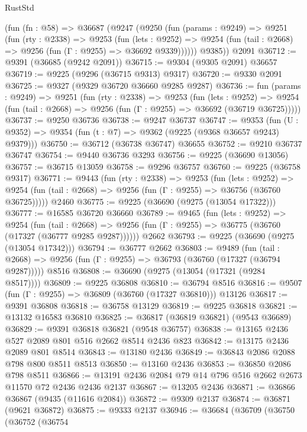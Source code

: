 \begin{lexlean}{RustStd}
\begin{coremodule}
    (fun (fn : @58) =>
    @36687
      (@9247
        (@9250
          (fun (params : @9249) =>
          @9251
            (fun (rty : @2338) =>
            @9253
              (fun (lets : @9252) =>
              @9254 (fun (tail : @2668) => @9256 (fun (Γ : @9255) => @36692 @9339))))))
        @9385))
    @2091
@36712 := @9391 (@36685 (@9242 @2091))
@36715 := @9304 (@9305 @2091) @36657
@36719 := @9225 (@9296 (@36715 @9313) @9317)
@36720 := @9330 @2091
@36725 := @9327 (@9329 @36720 @36660 @9285 @9287)
@36736 := fun (params : @9249) =>
  @9251
    (fun (rty : @2338) =>
    @9253
      (fun (lets : @9252) =>
      @9254 (fun (tail : @2668) => @9256 (fun (Γ : @9255) => @36692 (@36719 @36725)))))
@36737 := @9250 @36736
@36738 := @9247 @36737
@36747 := @9353
    (fun (U : @9352) => @9354 (fun (t : @7) => @9362 (@9225 (@9368 @36657 @9243) @9379)))
@36750 := @36712 (@36738 @36747) @36655
@36752 := @9210 @36737 @36747
@36754 := @9440 @36736 @3293
@36756 := @9225 (@36690 @13056)
@36757 := @36715 @13059
@36758 := @9296 @36757
@36760 := @9225 (@36758 @9317)
@36771 := @9443
    (fun (rty : @2338) =>
    @9253
      (fun (lets : @9252) =>
      @9254 (fun (tail : @2668) => @9256 (fun (Γ : @9255) => @36756 (@36760 @36725)))))
    @2460
@36775 := @9225 (@36690 (@9275 (@13054 @17322)))
@36777 := @16585 @36720 @36660
@36789 := @9465
    (fun (lets : @9252) =>
    @9254
      (fun (tail : @2668) =>
      @9256 (fun (Γ : @9255) => @36775 (@36760 (@17327 (@36777 @9285 @9287))))))
    @2662
@36793 := @9225 (@36690 (@9275 (@13054 @17342)))
@36794 := @36777 @2662
@36803 := @9489
    (fun (tail : @2668) => @9256 (fun (Γ : @9255) => @36793 (@36760 (@17327 (@36794 @9287)))))
    @8516
@36808 := @36690 (@9275 (@13054 (@17321 (@9284 @8517))))
@36809 := @9225 @36808
@36810 := @36794 @8516
@36816 := @9507 (fun (Γ : @9255) => @36809 (@36760 (@17327 @36810))) @13126
@36817 := @9391 @36808
@36818 := @36758 @13129
@36819 := @9225 @36818
@36821 := @13132 @16583 @36810
@36825 := @36817 (@36819 @36821) (@9543 @36689)
@36829 := @9391 @36818 @36821 (@9548 @36757)
@36838 := @13165 @2436 @527 @2089 @801 @516 @2662 @8514 @2436 @823
@36842 := @13175 @2436 @2089 @801 @8514
@36843 := @13180 @2436
@36849 := @36843 @2086 @2088 @798 @800 @8511 @8513
@36850 := @13160 @2436
@36853 := @36850 @2086 @798 @8511
@36866 := @13191 @2436 @2084 @79 @14 @796 @516 @2662 @2673 @11570 @72 @2436 @2436 @2137
@36867 := @13205 @2436
@36871 := @36866 @36867 (@9435 (@11616 @2084))
@36872 := @9309 @2137
@36874 := @36871 (@9621 @36872)
@36875 := @9333 @2137
@36946 := @36684
    (@36709
      (@36750
        (@36752
          (@36754

\end{coremodule}
\end{lexlean}
